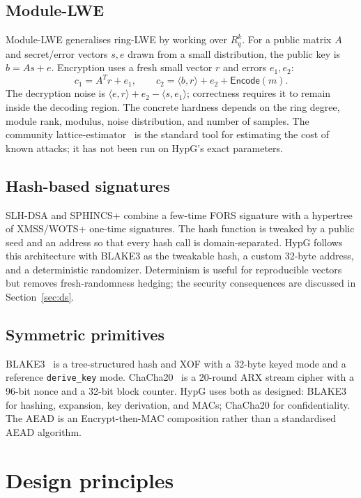 \documentclass[11pt,a4paper]{article}
\theoremstyle{plain}
\theoremstyle{definition}
\theoremstyle{remark}
\newcommand{\Encode}{\mathsf{Encode}}
\begin{document}
\subsection{Module-LWE}

Module-LWE generalises ring-LWE by working over $R_q^k$.  For a public
matrix $A$ and secret/error vectors $s,e$ drawn from a small
distribution, the public key is $b=A s+e$.  Encryption uses a fresh
small vector $r$ and errors $e_1,e_2$:
\[
  c_1 = A^{T}r+e_1, \qquad
  c_2 = \langle b,r\rangle + e_2 + \Encode(m).
\]
The decryption noise is $\langle e,r\rangle+e_2-\langle s,e_1\rangle$;
correctness requires it to remain inside the decoding region.  The
concrete hardness depends on the ring degree, module rank, modulus,
noise distribution, and number of samples.  The community
lattice-estimator~\cite{estimator} is the standard tool for estimating
the cost of known attacks; it has not been run on HypG's exact
parameters.

\subsection{Hash-based signatures}

SLH-DSA and SPHINCS+ combine a few-time FORS signature with a hypertree
of XMSS/WOTS+ one-time signatures.  The hash function is tweaked by a
public seed and an address so that every hash call is
domain-separated.  HypG follows this architecture with BLAKE3 as the
tweakable hash, a custom 32-byte address, and a deterministic
randomizer.  Determinism is useful for reproducible vectors but removes
fresh-randomness hedging; the security consequences are discussed in
Section~\ref{sec:ds}.

\subsection{Symmetric primitives}

BLAKE3~\cite{blake3} is a tree-structured hash and XOF with a
32-byte keyed mode and a reference \texttt{derive\_key} mode.
ChaCha20~\cite{rfc8439} is a 20-round ARX stream cipher with a 96-bit
nonce and a 32-bit block counter.  HypG uses both as designed: BLAKE3
for hashing, expansion, key derivation, and MACs; ChaCha20 for
confidentiality.  The AEAD is an Encrypt-then-MAC composition rather
than a standardised AEAD algorithm.

\section{Design principles}
\label{sec:principles}
\end{document}
